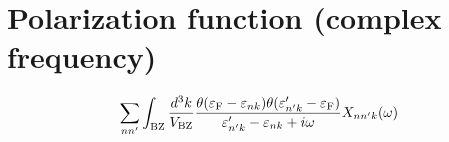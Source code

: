 \documentclass[letterpaper,10pt,pdftex,openany,english]{sphinxmanual}
\begin{document}
\section{Polarization function (complex frequency)}
\label{\detokenize{routine:polarization-function-complex-frequency}}\begin{equation*}
\begin{split}\begin{align}
\sum_{n n'}
\int_{\rm BZ} \frac{d^3 k}{V_{\rm BZ}}
\frac{\theta(\varepsilon_{\rm F} - \varepsilon_{n k})
\theta(\varepsilon'_{n' k} - \varepsilon_{\rm F})}
{\varepsilon'_{n' k} - \varepsilon_{n k} + i \omega}
X_{n n' k}(\omega)
\end{align}\end{split}
\end{equation*}
\begin{sphinxVerbatim}[commandchars=\\\{\}]
\end{sphinxVerbatim}
\end{document}
